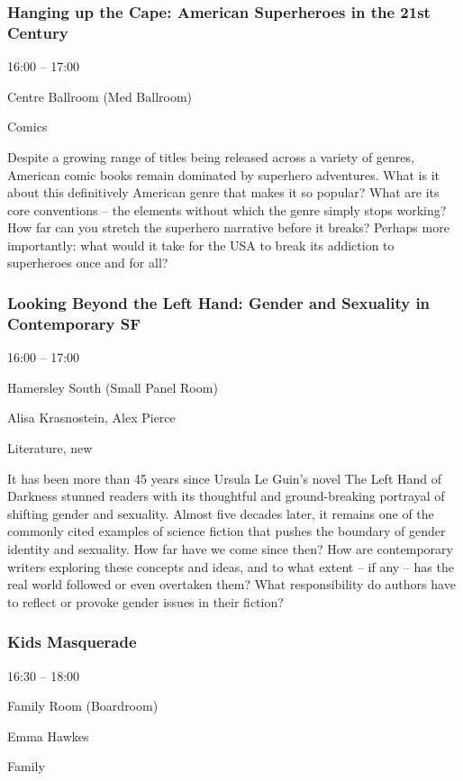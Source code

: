 \documentclass{scrreprt}
\begin{document}
\begin{multicols}{2}
\subsubsection*{Hanging up the Cape: American Superheroes in the 21st Century}\begin{description}
\setlength{\itemsep}{0pt}
\setlength{\parsep}{0pt}
\setlength{\parskip}{0pt}
\item[Time:]{16:00 -- 17:00}
\item[Venue:]{Centre Ballroom (Med Ballroom)}
\item[Tags:]{Comics}\end{description}
Despite a growing range of titles being released across a variety of genres, American comic books remain dominated by superhero adventures. What is it about this definitively American genre that makes it so popular? What are its core conventions – the elements without which the genre simply stops working? How far can you stretch the superhero narrative before it breaks? Perhaps more importantly: what would it take for the USA to break its addiction to superheroes once and for all?
\subsubsection*{Looking Beyond the Left Hand: Gender and Sexuality in Contemporary SF}\begin{description}
\setlength{\itemsep}{0pt}
\setlength{\parsep}{0pt}
\setlength{\parskip}{0pt}
\item[Time:]{16:00 -- 17:00}
\item[Venue:]{Hamersley South (Small Panel Room)}
\item[People:]{Alisa Krasnostein, Alex Pierce}
\item[Tags:]{Literature, new}\end{description}
It has been more than 45 years since Ursula Le Guin’s novel The Left Hand of Darkness stunned readers with its thoughtful and ground-breaking portrayal of shifting gender and sexuality. Almost five decades later, it remains one of the commonly cited examples of science fiction that pushes the boundary of gender identity and sexuality. How far have we come since then? How are contemporary writers exploring these concepts and ideas, and to what extent – if any – has the real world followed or even overtaken them? What responsibility do authors have to reflect or provoke gender issues in their fiction?
\subsubsection*{Kids Masquerade}\begin{description}
\setlength{\itemsep}{0pt}
\setlength{\parsep}{0pt}
\setlength{\parskip}{0pt}
\item[Time:]{16:30 -- 18:00}
\item[Venue:]{Family Room (Boardroom)}
\item[People:]{Emma Hawkes}
\item[Tags:]{Family}\end{description}


\end{multicols}
\end{document}

